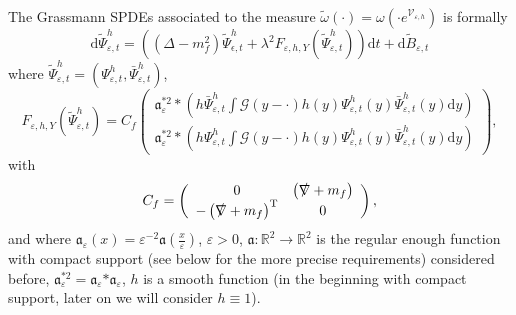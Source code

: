 \documentclass{article}
\newcommand{\Tau}{\mathrm{T}}
\newcommand{\asterisk}{\mathord{*}}
\newcommand{\mathd}{\mathrm{d}}
\newcommand{\slashnabla}{\slashed{\nabla}}
\begin{document}
The Grassmann SPDEs associated to the measure $\tilde{\omega} (\cdot) = \omega
(\cdot e^{\mathcal{V}_{\varepsilon, h}})$ is formally
\begin{equation}
  \mathd \tilde{\Psi}_{\varepsilon, t}^h = ((\Delta - m_f^2)
  \tilde{\Psi}_{\epsilon, t}^h + \lambda^2 F_{\varepsilon, h, Y}
  (\tilde{\Psi}_{\varepsilon, t}^h)) \mathd t + \mathd \tilde{B}_{\varepsilon,
  t} \label{eq:stochasticquantization}
\end{equation}
where $\tilde{\Psi}_{\varepsilon, t}^h = (\Psi_{\varepsilon, t}^h,
\bar{\Psi}_{\varepsilon, t}^h)$,
\[ F_{\varepsilon, h, Y} (\tilde{\Psi}_{\varepsilon, t}^h) = C_f \left(
   \begin{array}{l}
     \mathfrak{a}_{\varepsilon}^{\asterisk 2} \ast \left( h
     \bar{\Psi}_{\varepsilon, t}^h \int \mathcal{G} (y - \cdot) h (y)
     \Psi_{\varepsilon, t}^h (y) \bar{\Psi}_{\varepsilon, t}^h (y) \mathd y
     \right)\\
     \mathfrak{a}_{\varepsilon}^{\asterisk 2} \ast \left( h \Psi_{\varepsilon,
     t}^h \int \mathcal{G} (y - \cdot) h (y) \Psi_{\varepsilon, t}^h (y)
     \bar{\Psi}_{\varepsilon, t}^h (y) \mathd y \right)
   \end{array} \right), \]
with
\begin{equation}
  C_f = \left(\begin{array}{cc}
    0 & \left( \slashnabla + m_f \right)\\
    - \left( \slashnabla + m_f \right)^{\Tau} & 0
  \end{array}\right), \label{eq:Cf}
\end{equation}
and where $\mathfrak{a}_{\varepsilon} (x) = \varepsilon^{- 2} \mathfrak{a}
\left( \frac{x}{\varepsilon} \right)$, $\varepsilon > 0$, $\mathfrak{a} :
\mathbb{R}^2 \rightarrow \mathbb{R}^2$ is the regular enough function with
compact support (see below for the more precise requirements) considered
before, $\mathfrak{a}_{\varepsilon}^{\asterisk 2} = \mathfrak{a}_{\varepsilon}
\asterisk \mathfrak{a}_{\varepsilon}$, $h$ is a smooth function (in the
beginning with compact support, later on we will consider $h \equiv 1$).
\end{document}
